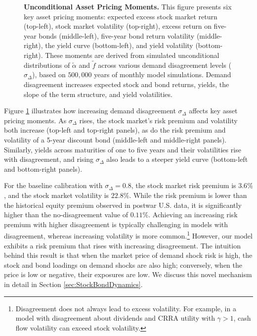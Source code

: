 \documentclass[preprint,11pt,authoryear]{elsarticle}
\theoremstyle{plain}
\begin{document}
\begin{figure}[htbp]
\begin{tabular}{cc}
\end{tabular}
\caption{\textbf{Unconditional Asset Pricing Moments.} This figure presents six key asset pricing moments: expected excess stock market return (top-left), stock market volatility (top-right), excess return on five-year bonds (middle-left), five-year bond return volatility (middle-right), the yield curve (bottom-left), and yield volatility (bottom-right). These moments are derived from simulated unconditional distributions of $\tilde{\alpha}$ and $\tilde{f}$ across various demand disagreement levels ($\sigma_{\Delta}$), based on $500,000$ years of monthly model simulations. Demand disagreement increases expected stock and bond returns, yields, the slope of the term structure, and yield volatilities.}   \label{fig:UnconditionalAP} 
\end{figure}
%

Figure \ref{fig:UnconditionalAP} illustrates how increasing demand disagreement \( \sigma_{\Delta}\) affects key asset pricing moments. As \( \sigma_{\Delta}\) rises, the stock market's risk premium and volatility both increase (top-left and top-right panels), as do the risk premium and volatility of a 5-year discount bond (middle-left and middle-right panels). Similarly, yields across maturities of one to five years and their volatilities rise with disagreement, and rising $\sigma_{\Delta}$ also leads to a steeper yield curve (bottom-left and bottom-right panels).

For the baseline calibration with \( \sigma_{\Delta}= 0.8 \), the stock market risk premium is \( 3.6\% \), and the stock market volatility is \( 22.8\% \). While the risk premium is lower than the historical equity premium observed in postwar U.S. data, it is significantly higher than the no-disagreement value of \( 0.11\% \). Achieving an increasing risk premium with higher disagreement is typically challenging in models with disagreement, whereas increasing volatility is more common.\footnote{Disagreement does not always lead to excess volatility. For example, in a model with disagreement about dividends and CRRA utility with \(\gamma > 1\), cash flow volatility can exceed stock volatility.}  However, our model  exhibits a risk premium that rises with increasing disagreement. The intuition behind this result is that when the market price of demand shock risk is high, the stock and bond loadings on demand shocks are also high; conversely, when the price is low or negative, their exposures are low.  We discuss this novel mechanism in detail in Section \ref{sec:StockBondDynamics}.
\end{document}
